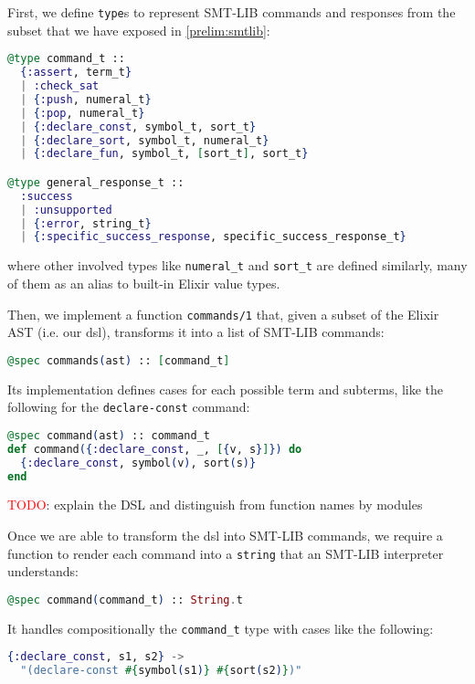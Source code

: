 First, we define \verb|type|s to represent SMT-LIB commands and responses
from the subset that we have exposed in \ref{prelim:smtlib}:

\begin{lstlisting}[language=elixir,numbers=none,frame=none]
@type command_t ::
  {:assert, term_t}
  | :check_sat
  | {:push, numeral_t}
  | {:pop, numeral_t}
  | {:declare_const, symbol_t, sort_t}
  | {:declare_sort, symbol_t, numeral_t}
  | {:declare_fun, symbol_t, [sort_t], sort_t}

@type general_response_t ::
  :success
  | :unsupported
  | {:error, string_t}
  | {:specific_success_response, specific_success_response_t}
\end{lstlisting}

where other involved types like \verb|numeral_t| and \verb|sort_t| are defined 
similarly, many of them as an alias to built-in Elixir value types.

Then, we implement a function \verb|commands/1| that, given a subset of the 
Elixir AST (i.e. our \gls{dsl}), transforms it into a list of SMT-LIB commands:

\begin{lstlisting}[language=elixir,numbers=none,frame=none]
@spec commands(ast) :: [command_t]
\end{lstlisting}
  
Its implementation defines cases for each possible term and subterms, 
like the following for the \verb|declare-const| command:

\begin{lstlisting}[language=elixir,numbers=none,frame=none]
@spec command(ast) :: command_t
def command({:declare_const, _, [{v, s}]}) do
  {:declare_const, symbol(v), sort(s)}
end
\end{lstlisting}

\textcolor{red}{TODO}: explain the DSL and distinguish from function names by modules

Once we are able to transform the \gls{dsl} into SMT-LIB commands, we require 
a function to render each command into a \verb|string| that an SMT-LIB
interpreter understands:

\begin{lstlisting}[language=elixir,numbers=none,frame=none]
@spec command(command_t) :: String.t
\end{lstlisting}

It handles compositionally the \verb|command_t| type with cases like the
following:

\begin{lstlisting}[language=elixir,numbers=none,frame=none]
{:declare_const, s1, s2} ->
  "(declare-const #{symbol(s1)} #{sort(s2)})"
\end{lstlisting}

